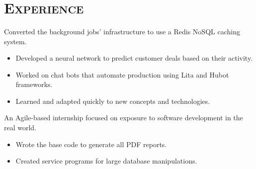\begin{resume}
\begin{formatb}
  \\
  \\
  \body\\
\end{formatb}

\section{\textsc{Experience}}
\begin{position}
  Converted the background jobs' infrastructure to use a Redis NoSQL caching system.
\begin{itemize}
\item Developed a neural network to predict customer deals based on their activity.
\end{itemize}
\begin{itemize}
\item Worked on chat bots that automate production using Lita and Hubot frameworks.
\end{itemize}
\begin{itemize}
\item Learned and adapted quickly to new concepts and technologies.
\end{itemize}
\end{position}

\begin{position}
  An Agile-based internship focused on exposure to software development in the real world.
\begin{itemize}
\item Wrote the base code to generate all PDF reports.
\end{itemize}
\begin{itemize}
\item Created service programs for large database manipulations.
\end{itemize}
\end{position}


\end{resume}
